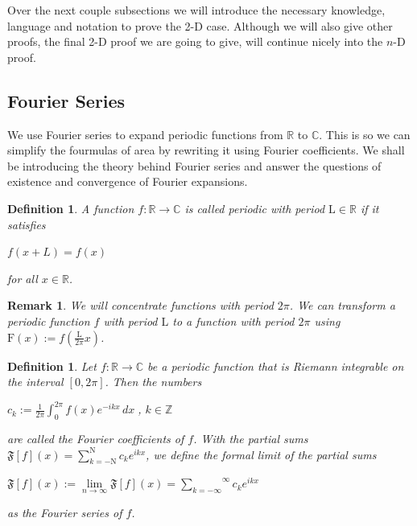 \documentclass[a4paper]{book}
\newtheorem{remark}[theorem]{Remark}%
\newtheorem{definition}[theorem]{Definition}%
\numberwithin{theorem}{section}%
\begin{document}
Over the next couple subsections we will introduce the necessary knowledge, language and notation to prove the 2-D case. Although we will also give other proofs, the final 2-D proof we are going to give, will continue nicely into the $n$-D proof.

\subsection{Fourier Series}
We use Fourier series to expand periodic functions from $\mathbb{R}$ to $\mathbb{C}$. This is so we can simplify the fourmulas of area by rewriting it using Fourier coefficients. We shall be introducing the theory behind Fourier series and answer the questions of existence and convergence of Fourier expansions.

\begin{definition}
    A function $f:\mathbb{R}\to\mathbb{C}$ is called \textit{periodic} with period $\mathrm{L}\in\mathbb{R}$ if it satisfies
    \begin{center}
        $f(x+L)=f(x)$
    \end{center}
    for all $x\in\mathbb{R}$.
\end{definition}

\begin{remark}
    We will concentrate functions with period $2\pi$. We can transform a periodic function $f$ with period $\mathrm{L}$ to a function with period $2\pi$ using $\displaystyle \mathrm{F}(x):=f(\frac{\mathrm{L}}{2\pi}x)$.
\end{remark}

\begin{definition}
    Let $f:\mathbb{R}\to\mathbb{C}$ be a periodic function that is Riemann integrable on the interval $[0,2\pi]$. Then the numbers
    \begin{center}
        $\displaystyle c_{k}:=\frac{1}{2\pi}\int_{0}^{2\pi}f(x)e^{-ikx}\,dx\;$, $k\in\mathbb{Z}$
    \end{center}
    are called the \textit{Fourier coefficients} of $f$. With the partial sums $\mathfrak{F}[f](x)=\sum_{k=-\mathrm{N}}^{\mathrm{N}}c_{k}e^{ikx}$, we define the formal limit of the partial sums
    \begin{center}
        $\displaystyle \mathfrak{F}[f](x):=\underset{n\to\infty}{\lim}\mathfrak{F}[f](x)=\overset{\infty}{\underset{k=-\infty}{\sum}}c_{k}e^{ikx}$
    \end{center}
    as the \textit{Fourier series} of $f$.
\end{definition}
\end{document}
